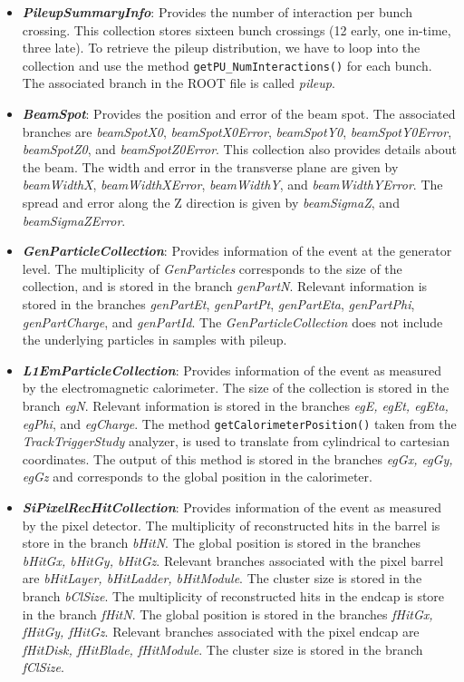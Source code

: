 \begin{itemize}
\item \textbf{\textit{PileupSummaryInfo}}: Provides the number of interaction per bunch crossing. This collection
stores sixteen bunch crossings (12 early, one in-time, three late). To retrieve the pileup distribution, we have
to loop into the collection and use the method \texttt{getPU\_NumInteractions()} for each bunch. The associated
branch in the ROOT file is called  {\it pileup}.
\item \textbf{\textit{BeamSpot}}: Provides the position and error of the beam spot.  The associated branches are
{\it beamSpotX0}, {\it beamSpotX0Error}, {\it beamSpotY0}, {\it beamSpotY0Error},
{\it beamSpotZ0}, and {\it beamSpotZ0Error}. This collection also provides details about the beam. The width and
error in the transverse plane are given by {\it beamWidthX}, {\it beamWidthXError}, {\it beamWidthY}, and
{\it beamWidthYError}. The spread and error along the Z direction is given by {\it beamSigmaZ}, and
{\it beamSigmaZError}.
\item \textbf{\textit{GenParticleCollection}}: Provides information of the event at the generator level. The
multiplicity of \textit{GenParticles} corresponds to the size of the collection, and is stored in the branch
{\it genPartN}. Relevant information is stored in the branches {\it genPartEt}, {\it genPartPt},
{\it genPartEta}, {\it genPartPhi}, {\it genPartCharge}, and {\it genPartId}. The \textit{GenParticleCollection}
does not include the underlying particles in samples with pileup. 
\item \textbf{\textit{L1EmParticleCollection}}: Provides information of the event as measured by the electromagnetic
calorimeter. The size of the collection is stored in the branch {\it egN}.
Relevant information is stored in the branches {\it egE, egEt, egEta, egPhi}, and \textit{egCharge}. The method
\texttt{getCalorimeterPosition()} taken from the \textit{TrackTriggerStudy} analyzer, is used to translate from
cylindrical to cartesian coordinates. The output of this method is stored in the branches {\it egGx, egGy, egGz}
and corresponds to the global position in the calorimeter.
\item \textbf{\textit{SiPixelRecHitCollection}}: Provides information of the event as measured by the pixel detector.
The multiplicity of reconstructed hits in the barrel is store in the branch {\it bHitN}. The global position is
stored in the branches {\it bHitGx, bHitGy, bHitGz}. Relevant branches associated with the pixel barrel are
{\it bHitLayer, bHitLadder, bHitModule}. The cluster size is stored in the branch {\it bClSize}. The multiplicity of
reconstructed hits in the endcap is store in the branch {\it fHitN}. The global position is stored in the branches
{\it fHitGx, fHitGy, fHitGz}. Relevant branches associated with the pixel endcap are {\it fHitDisk, fHitBlade,
fHitModule}. The cluster size is stored in the branch {\it fClSize}.
\end{itemize}

